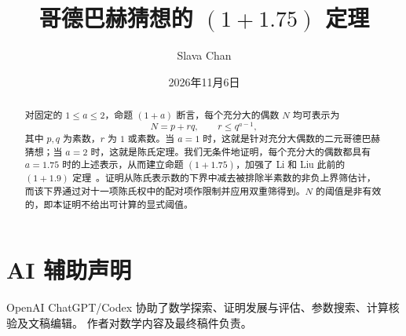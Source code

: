 \documentclass[11pt]{amsart}
\title{哥德巴赫猜想的 $(1+1.75)$ 定理}
\author{Slava Chan}
\date{2026年11月6日}
\theoremstyle{definition}
\begin{document}
\begin{abstract}
对固定的 $1\le a\le2$，命题 $(1+a)$ 断言，每个充分大的偶数 $N$ 均可表示为
\[
 N=p+rq,\qquad r\le q^{a-1},
\]
其中 $p,q$ 为素数，$r$ 为 $1$ 或素数。当 $a=1$ 时，这就是针对充分大偶数的二元哥德巴赫猜想；当 $a=2$ 时，这就是陈氏定理。我们无条件地证明，每个充分大的偶数都具有 $a=1.75$ 时的上述表示，从而建立命题 $(1+1.75)$，加强了 Li 和 Liu 此前的 $(1+1.9)$ 定理~\cite{LiLiu}。证明从陈氏表示数的下界中减去被排除半素数的非负上界筛估计，而该下界通过对十一项陈氏权中的配对项作限制并应用双重筛得到。$N$ 的阈值是非有效的，即本证明不给出可计算的显式阈值。
\end{abstract}
\maketitle


\appendix




\section*{AI 辅助声明}
OpenAI ChatGPT/Codex 协助了数学探索、证明发展与评估、参数搜索、计算核验及文稿编辑。
作者对数学内容及最终稿件负责。


\end{document}
